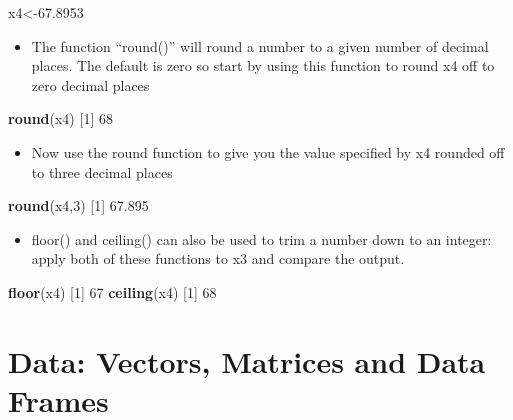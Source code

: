 \documentclass[
]{book}
\newenvironment{Shaded}{\begin{snugshade}}{\end{snugshade}}
\newcommand{\DecValTok}[1]{\textcolor[rgb]{0.00,0.00,0.81}{#1}}
\newcommand{\FloatTok}[1]{\textcolor[rgb]{0.00,0.00,0.81}{#1}}
\newcommand{\KeywordTok}[1]{\textcolor[rgb]{0.13,0.29,0.53}{\textbf{#1}}}
\newcommand{\NormalTok}[1]{#1}
\providecommand{\tightlist}{%
  \setlength{\itemsep}{0pt}\setlength{\parskip}{0pt}}
\begin{document}
\begin{Shaded}
\begin{Highlighting}[]
\NormalTok{x4<-}\FloatTok{67.8953}
\end{Highlighting}
\end{Shaded}

\begin{itemize}
\tightlist
\item
  The function ``round()'' will round a number to a given number of decimal places. The default is zero so start by using this function to round x4 off to zero decimal places
\end{itemize}

\begin{Shaded}
\begin{Highlighting}[]
\KeywordTok{round}\NormalTok{(x4)}
\NormalTok{[}\DecValTok{1}\NormalTok{] }\DecValTok{68}
\end{Highlighting}
\end{Shaded}

\begin{itemize}
\tightlist
\item
  Now use the round function to give you the value specified by x4 rounded off to three decimal places
\end{itemize}

\begin{Shaded}
\begin{Highlighting}[]
\KeywordTok{round}\NormalTok{(x4,}\DecValTok{3}\NormalTok{)}
\NormalTok{[}\DecValTok{1}\NormalTok{] }\FloatTok{67.895}
\end{Highlighting}
\end{Shaded}

\begin{itemize}
\tightlist
\item
  floor() and ceiling() can also be used to trim a number down to an integer: apply both of these functions to x3 and compare the output.
\end{itemize}

\begin{Shaded}
\begin{Highlighting}[]
\KeywordTok{floor}\NormalTok{(x4)}
\NormalTok{[}\DecValTok{1}\NormalTok{] }\DecValTok{67}
\KeywordTok{ceiling}\NormalTok{(x4)       }
\NormalTok{[}\DecValTok{1}\NormalTok{] }\DecValTok{68}
\end{Highlighting}
\end{Shaded}

\hypertarget{data-vectors-matrices-and-data-frames}{%
\chapter{Data: Vectors, Matrices and Data Frames}\label{data-vectors-matrices-and-data-frames}}
\end{document}
